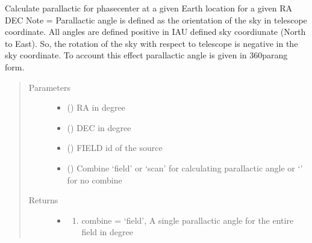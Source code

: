 \documentclass[letterpaper,10pt,english]{sphinxmanual}
\begin{document}
\begin{fulllineitems}
\begin{fulllineitems}
\label{\detokenize{paircars:paircars.access_ms.AccessMS.get_parang}}
\sphinxAtStartPar
Calculate parallactic for phasecenter at a given Earth location for a given RA DEC
Note = Parallactic angle is defined as the orientation of the sky in telescope coordinate. All angles are defined positive in IAU defined sky coordiunate (North to East).
So, the rotation of the sky with respect to telescope is negative in the sky coordinate. To account this effect parallactic angle is given in 360\sphinxhyphen{}parang form.
\begin{quote}\begin{description}
\item[{Parameters}] \leavevmode\begin{itemize}
\item {} 
\sphinxAtStartPar
{} () \textendash{} RA in degree

\item {} 
\sphinxAtStartPar
{} () \textendash{} DEC in degree

\item {} 
\sphinxAtStartPar
{} () \textendash{} FIELD id of the source

\item {} 
\sphinxAtStartPar
{} () \textendash{} Combine ‘field’ or ‘scan’ for calculating parallactic angle or ‘’ for no combine

\end{itemize}

\item[{Returns}] \leavevmode
\sphinxAtStartPar
\begin{itemize}
\item {} 
\sphinxAtStartPar
{} \textendash{}
\begin{enumerate}
%
\item {} 
\sphinxAtStartPar
combine = ‘field’, A single parallactic angle for the entire field in degree


\end{enumerate}
\end{itemize}
\end{description}
\end{quote}
\end{fulllineitems}
\end{fulllineitems}
\end{document}
